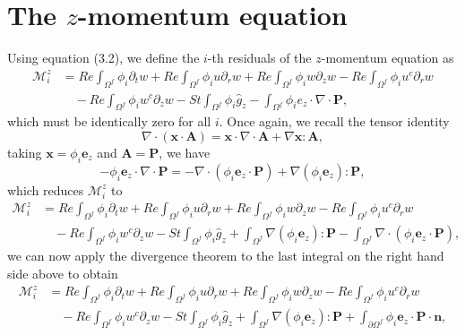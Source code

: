 \documentclass{article}
\begin{document}
\section{The $z$-momentum equation} %
Using equation (3.2), we define the $i$-th residuals of the $z$-momentum equation as
\begin{align}
\mathcal{M}_i^z &= Re \int_{\Omega^f} \phi_i \partial_t w + Re \int_{\Omega^f} \phi_i u \partial_r w + Re \int_{\Omega^f} \phi_i w \partial_z w - Re \int_{\Omega^f} \phi_i u^c \partial_r w \nonumber\\
&\quad - Re \int_{\Omega^f} \phi_i w^c \partial_z w - St \int_{\Omega^f} \phi_i \hat{g}_z - \int_{\Omega^f} \phi_i e_z \cdot \nabla \cdot \mathbf{P}, \tag{5.1}
\end{align}
which must be identically zero for all $i$.
Once again, we recall the tensor identity
\begin{equation}
\nabla \cdot (\mathbf{x} \cdot \mathbf{A}) = \mathbf{x} \cdot \nabla \cdot \mathbf{A} + \nabla \mathbf{x} : \mathbf{A}, \tag{5.2}
\end{equation}
taking $\mathbf{x} = \phi_i \mathbf{e}_z$ and $\mathbf{A} = \mathbf{P}$, we have
\begin{equation}
-\phi_i \mathbf{e}_z \cdot \nabla \cdot \mathbf{P} = -\nabla \cdot (\phi_i \mathbf{e}_z \cdot \mathbf{P}) + \nabla (\phi_i \mathbf{e}_z) : \mathbf{P}, \tag{5.3}
\end{equation}
which reduces $\mathcal{M}_i^z$ to
\begin{align}
\mathcal{M}_i^z &= Re \int_{\Omega^f} \phi_i \partial_t w + Re \int_{\Omega^f} \phi_i u \partial_r w + Re \int_{\Omega^f} \phi_i w \partial_z w - Re \int_{\Omega^f} \phi_i u^c \partial_r w \nonumber\\
&\quad - Re \int_{\Omega^f} \phi_i w^c \partial_z w - St \int_{\Omega^f} \phi_i \hat{g}_z + \int_{\Omega^f} \nabla (\phi_i \mathbf{e}_z) : \mathbf{P} - \int_{\Omega^f} \nabla \cdot (\phi_i \mathbf{e}_z \cdot \mathbf{P}), \tag{5.4}
\end{align}
we can now apply the divergence theorem to the last integral on the right hand side above to obtain
\begin{align}
\mathcal{M}_i^z &= Re \int_{\Omega^f} \phi_i \partial_t w + Re \int_{\Omega^f} \phi_i u \partial_r w + Re \int_{\Omega^f} \phi_i w \partial_z w - Re \int_{\Omega^f} \phi_i u^c \partial_r w \nonumber\\
&\quad - Re \int_{\Omega^f} \phi_i w^c \partial_z w - St \int_{\Omega^f} \phi_i \hat{g}_z + \int_{\Omega^f} \nabla (\phi_i \mathbf{e}_z) : \mathbf{P} + \int_{\partial \Omega^f} \phi_i \mathbf{e}_z \cdot \mathbf{P} \cdot \mathbf{n}, \tag{5.5}
\end{align}
\end{document}
